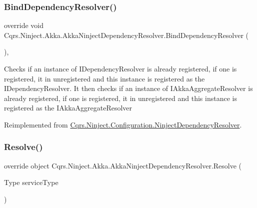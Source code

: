 \subsubsection{\texorpdfstring{Bind\+Dependency\+Resolver()}{BindDependencyResolver()}}
{\footnotesize\ttfamily override void Cqrs.\+Ninject.\+Akka.\+Akka\+Ninject\+Dependency\+Resolver.\+Bind\+Dependency\+Resolver (\begin{DoxyParamCaption}{ }\end{DoxyParamCaption})\hspace{0.3cm}{\ttfamily [protected]}, {\ttfamily [virtual]}}



Checks if an instance of I\+Dependency\+Resolver is already registered, if one is registered, it in unregistered and this instance is registered as the I\+Dependency\+Resolver. It then checks if an instance of I\+Akka\+Aggregate\+Resolver is already registered, if one is registered, it in unregistered and this instance is registered as the I\+Akka\+Aggregate\+Resolver 



Reimplemented from \hyperlink{classCqrs_1_1Ninject_1_1Configuration_1_1NinjectDependencyResolver_a2b663d936fcded5f679623bf0b0393e6_a2b663d936fcded5f679623bf0b0393e6}{Cqrs.\+Ninject.\+Configuration.\+Ninject\+Dependency\+Resolver}.

\mbox{\label{classCqrs_1_1Ninject_1_1Akka_1_1AkkaNinjectDependencyResolver_adace29de71f10e34e952bd41e48106a6_adace29de71f10e34e952bd41e48106a6}} 
\subsubsection{\texorpdfstring{Resolve()}{Resolve()}\hspace{0.1cm}{\footnotesize\ttfamily [1/2]}}
{\footnotesize\ttfamily override object Cqrs.\+Ninject.\+Akka.\+Akka\+Ninject\+Dependency\+Resolver.\+Resolve (\begin{DoxyParamCaption}\item[{Type}]{service\+Type }\end{DoxyParamCaption})\hspace{0.3cm}{\ttfamily [virtual]}}



